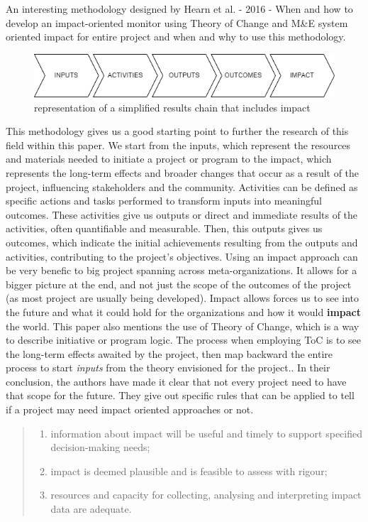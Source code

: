 \documentclass[conference]{IEEEtran}
\begin{document}
An interesting methodology designed by Hearn et al. - 2016 - When and how to develop an impact-oriented monitor \cite{hearn_when_2016} using Theory of Change and M\&E system oriented impact for entire project and when and why to use this methodology.
\begin{figure}[H]
    \centering
    \includegraphics[width=1\linewidth]{res//diagrammes/impact_method_process.png}
    \caption{representation of a simplified results chain that includes impact\cite{hearn_when_2016}}
    \label{fig:enter-label}
\end{figure}
This methodology gives us a good starting point to further the research of this field within this paper. We start from the inputs, which represent the resources and materials needed to initiate a project or program to the impact, which represents the long-term effects and broader changes that occur as a result of the project, influencing stakeholders and the community.
Activities can be defined as specific actions and tasks performed to transform inputs into meaningful outcomes. These activities give us outputs or direct and immediate results of the activities, often quantifiable and measurable. Then, this outputs gives us outcomes, which indicate the initial achievements resulting from the outputs and activities, contributing to the project's objectives.
Using an impact approach can be very benefic to big project spanning across meta-organizations. It allows for a bigger picture at the end, and not just the scope of the outcomes of the project (as most project are usually being developed). Impact allows forces us to see into the future and what it could hold for the organizations and how it would \textbf{impact} the world.
This paper also mentions the use of Theory of Change, which is a way to describe initiative or program logic. The process when employing ToC is to see the long-term effects awaited by the project, then map backward the entire process to start \textit{inputs} from the theory envisioned for the project.\cite{taplin_toc-tech-papers_imppdf_2013}.
In their conclusion, the authors have made it clear that not every project need to have that scope for the future. They give out specific rules that can be applied to tell if a project may need impact oriented approaches or not. 
\begin{quote}
    \begin{enumerate}
        \item information	about	 impact	will	be	useful	and	timely	to	support	specified	 decision-making	needs;
        \item impact	is	deemed	plausible	 and	is	feasible	to	assess	with	rigour;
        \item resources	 and	capacity	for	collecting,	analysing	and	interpreting	 impact	data	are	adequate.
    \end{enumerate}		
\end{quote}
\end{document}
